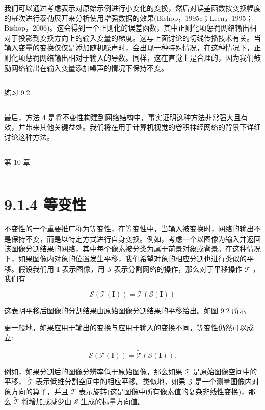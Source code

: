 \documentclass[10pt]{article}
\newcommand{\HRule}{\begin{center}\rule{0.9\linewidth}{0.2mm}\end{center}}
\begin{document}
我们可以通过考虑表示对原始示例进行小变化的变换，然后对误差函数按变换幅度的幂次进行泰勒展开来分析使用增强数据的效果(Bishop，1995c；Leen，1995；Bishop，2006)。这会得到一个正则化的误差函数，其中正则化项惩罚网络输出相对于投影到变换方向上的输入变量的梯度。这与上面讨论的切线传播技术有关。当输入变量的变换仅仅是添加随机噪声时，会出现一种特殊情况，在这种情况下，正则化项惩罚网络输出相对于输入的导数。同样，这在直觉上是合理的，因为我们鼓励网络输出在输入变量添加噪声的情况下保持不变。

\HRule

练习 9.2

\HRule

最后，方法 4 是将不变性构建到网络结构中，事实证明这种方法非常强大且有效，并带来其他关键益处。我们将在用于计算机视觉的卷积神经网络的背景下详细讨论这种方法。

\HRule

第 10 章

\HRule

\section*{9.1.4 等变性}

不变性的一个重要推广称为等变性，在等变性中，当输入被变换时，网络的输出不是保持不变，而是以特定方式进行自身变换。例如，考虑一个以图像为输入并返回该图像分割结果的网络，其中每个像素被分类为属于前景对象或背景。在这种情况下，如果图像内对象的位置发生平移，我们希望对象的相应分割也进行类似的平移。假设我们用 \(\mathbf{I}\) 表示图像，用 \(\mathcal{S}\) 表示分割网络的操作，那么对于平移操作 \(\mathcal{T}\) ，我们有

\[
\mathcal{S}\left( {\mathcal{T}\left( \mathbf{I}\right) }\right)  = \mathcal{T}\left( {\mathcal{S}\left( \mathbf{I}\right) }\right)  \tag{9.2}
\]

这表明平移后图像的分割结果由原始图像分割结果的平移给出。如图 9.2 所示

更一般地，如果应用于输出的变换与应用于输入的变换不同，等变性仍然可以成立:

\[
\mathcal{S}\left( {\mathcal{T}\left( \mathbf{I}\right) }\right)  = \widetilde{\mathcal{T}}\left( {\mathcal{S}\left( \mathbf{I}\right) }\right) . \tag{9.3}
\]

例如，如果分割后的图像分辨率低于原始图像，那么如果 \(\mathcal{T}\) 是原始图像空间中的平移， \(\widetilde{\mathcal{T}}\) 表示低维分割空间中的相应平移。类似地，如果 \(\mathcal{S}\) 是一个测量图像内对象方向的算子，并且 \(\mathcal{T}\) 表示旋转(这是图像中所有像素值的复杂非线性变换)，那么 \(\widetilde{\mathcal{T}}\) 将增加或减少由 \(\mathcal{S}\) 生成的标量方向值。
\end{document}
